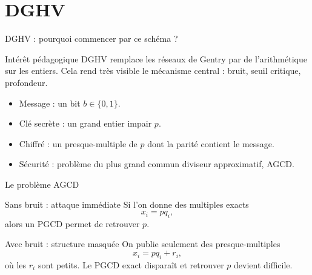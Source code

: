 \documentclass[10pt,aspectratio=169]{beamer}
\begin{document}
\section{DGHV}

\begin{frame}{DGHV : pourquoi commencer par ce schéma ?}
  \begin{block}{Intérêt pédagogique}
    DGHV remplace les réseaux de Gentry par de l'arithmétique sur les entiers. Cela rend très visible le mécanisme central : bruit, seuil critique, profondeur.
  \end{block}

  \begin{itemize}
    \item Message : un bit $b\in\{0,1\}$.
    \item Clé secrète : un grand entier impair $p$.
    \item Chiffré : un presque-multiple de $p$ dont la parité contient le message.
    \item Sécurité : problème du plus grand commun diviseur approximatif, AGCD.
  \end{itemize}
\end{frame}

\begin{frame}{Le problème AGCD}
  \begin{block}{Sans bruit : attaque immédiate}
    Si l'on donne des multiples exacts
    \[
      x_i=pq_i,
    \]
    alors un PGCD permet de retrouver $p$.
  \end{block}

  \begin{exampleblock}{Avec bruit : structure masquée}
    On publie seulement des presque-multiples
    \[
      x_i=pq_i+r_i,
    \]
    où les $r_i$ sont petits. Le PGCD exact disparaît et retrouver $p$ devient difficile.
  \end{exampleblock}
\end{frame}
\end{document}
